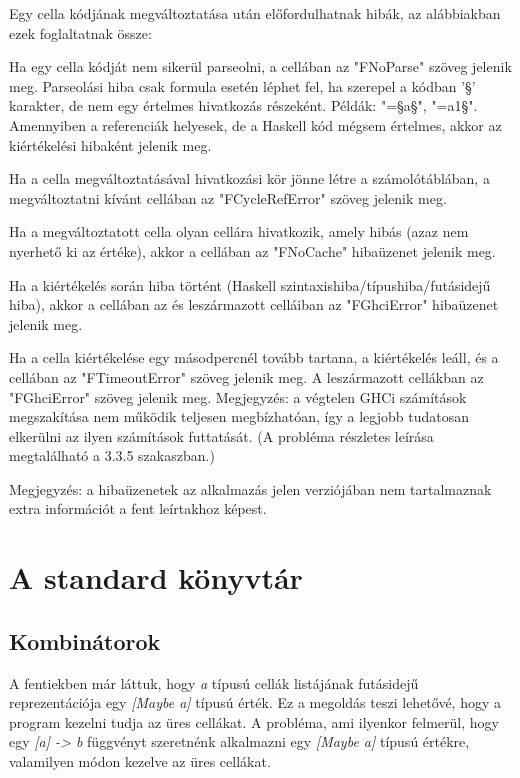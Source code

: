 Egy cella kódjának megváltoztatása után előfordulhatnak hibák, az alábbiakban ezek foglaltatnak össze:
\begin{compactenum}
	\item Ha egy cella kódját nem sikerül parseolni, a cellában az "FNoParse" szöveg jelenik meg. Parseolási hiba csak formula esetén léphet fel, ha szerepel a kódban '§' karakter, de nem egy értelmes hivatkozás részeként. Példák: "=§a§", "=a1§". Amennyiben a referenciák helyesek, de a Haskell kód mégsem értelmes, akkor az kiértékelési hibaként jelenik meg.
	\item Ha a cella megváltoztatásával hivatkozási kör jönne létre a számolótáblában, a megváltoztatni kívánt cellában az "FCycleRefError" szöveg jelenik meg.
	\item Ha a megváltoztatott cella olyan cellára hivatkozik, amely hibás (azaz nem nyerhető ki az értéke), akkor a cellában az "FNoCache" hibaüzenet jelenik meg. 
	\item Ha a kiértékelés során hiba történt (Haskell szintaxishiba/típushiba/futásidejű hiba), akkor a cellában az és leszármazott celláiban az "FGhciError" hibaüzenet jelenik meg.
	\item Ha a cella kiértékelése egy másodpercnél tovább tartana, a kiértékelés leáll, és a cellában az "FTimeoutError" szöveg jelenik meg. A leszármazott cellákban az "FGhciError" szöveg jelenik meg. Megjegyzés: a végtelen GHCi számítások megszakítása nem működik teljesen megbízhatóan, így a legjobb tudatosan elkerülni az ilyen számítások futtatását. (A probléma részletes leírása megtalálható a 3.3.5 szakaszban.)
\end{compactenum}
	
Megjegyzés: a hibaüzenetek az alkalmazás jelen verziójában nem tartalmaznak extra információt a fent leírtakhoz képest. 


\section{A standard könyvtár}

\subsection{Kombinátorok}

A fentiekben már láttuk, hogy \textit{a} típusú cellák listájának futásidejű reprezentációja egy \textit{[Maybe a]} típusú érték. Ez a megoldás teszi lehetővé, hogy a program kezelni tudja az üres cellákat. A probléma, ami ilyenkor felmerül, hogy egy \textit{[a] -> b} függvényt szeretnénk alkalmazni egy \textit{[Maybe a]} típusú értékre, valamilyen módon kezelve az üres cellákat.

